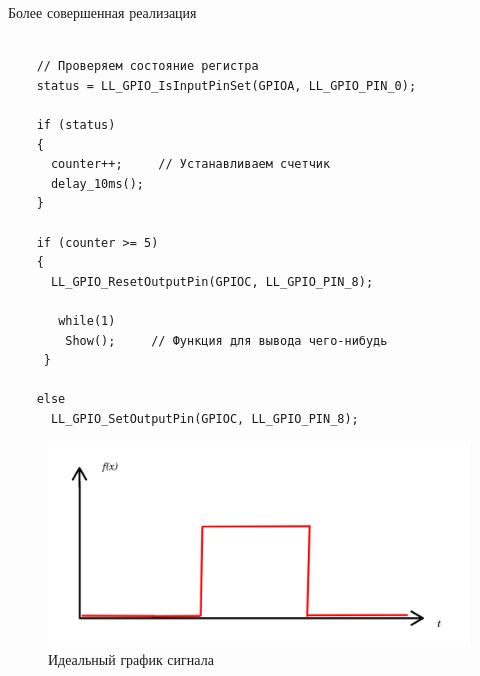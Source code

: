 Более совершенная реализация
\begin{verbatim}
    
    // Проверяем состояние регистра
    status = LL_GPIO_IsInputPinSet(GPIOA, LL_GPIO_PIN_0);
 
    if (status)
    {
      counter++;     // Устанавливаем счетчик
      delay_10ms();
    }
        
    if (counter >= 5)                                   
    {
      LL_GPIO_ResetOutputPin(GPIOC, LL_GPIO_PIN_8);
        
       while(1)
        Show();     // Функция для вывода чего-нибудь
     }
   
    else
      LL_GPIO_SetOutputPin(GPIOC, LL_GPIO_PIN_8);
\end{verbatim}



\begin{figure}[h!]
		\centering
		\includegraphics[width=1\linewidth]{pics/ideal_sing.png}
		\caption{Идеальный график сигнала}
		\label{ideal_graph}
\end{figure}
